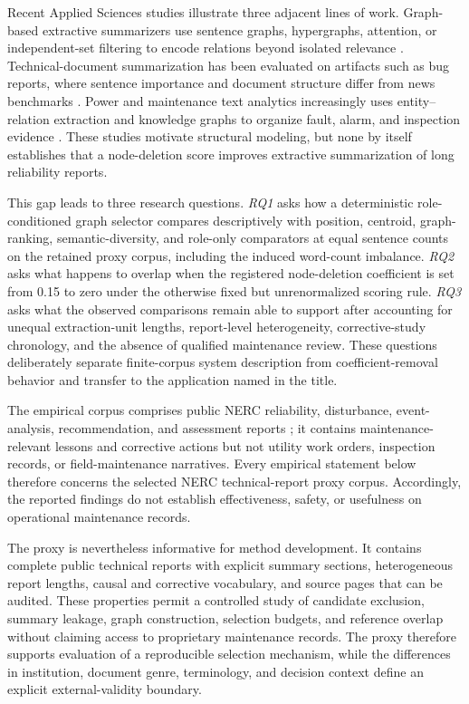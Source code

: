 \documentclass[applsci,article,submit,moreauthors]{Definitions/mdpi}
\begin{document}
Recent Applied Sciences studies illustrate three adjacent lines of work. Graph-based extractive summarizers use sentence graphs, hypergraphs, attention, or independent-set filtering to encode relations beyond isolated relevance \cite{siragusa2022sentencegraph,onan2024mches,hark2025mis}. Technical-document summarization has been evaluated on artifacts such as bug reports, where sentence importance and document structure differ from news benchmarks \cite{koh2022bugreport}. Power and maintenance text analytics increasingly uses entity--relation extraction and knowledge graphs to organize fault, alarm, and inspection evidence \cite{liu2022powerfault,ma2025alarm,zgg2026bridge}. These studies motivate structural modeling, but none by itself establishes that a node-deletion score improves extractive summarization of long reliability reports.

This gap leads to three research questions. \textit{RQ1} asks how a deterministic role-conditioned graph selector compares descriptively with position, centroid, graph-ranking, semantic-diversity, and role-only comparators at equal sentence counts on the retained proxy corpus, including the induced word-count imbalance. \textit{RQ2} asks what happens to overlap when the registered node-deletion coefficient is set from 0.15 to zero under the otherwise fixed but unrenormalized scoring rule. \textit{RQ3} asks what the observed comparisons remain able to support after accounting for unequal extraction-unit lengths, report-level heterogeneity, corrective-study chronology, and the absence of qualified maintenance review. These questions deliberately separate finite-corpus system description from coefficient-removal behavior and transfer to the application named in the title.

The empirical corpus comprises public NERC reliability, disturbance, event-analysis, recommendation, and assessment reports \cite{nercEventAnalysis,nerc2015qualityreport}; it contains maintenance-relevant lessons and corrective actions but not utility work orders, inspection records, or field-maintenance narratives. Every empirical statement below therefore concerns the selected NERC technical-report proxy corpus. Accordingly, the reported findings do not establish effectiveness, safety, or usefulness on operational maintenance records.

The proxy is nevertheless informative for method development. It contains complete public technical reports with explicit summary sections, heterogeneous report lengths, causal and corrective vocabulary, and source pages that can be audited. These properties permit a controlled study of candidate exclusion, summary leakage, graph construction, selection budgets, and reference overlap without claiming access to proprietary maintenance records. The proxy therefore supports evaluation of a reproducible selection mechanism, while the differences in institution, document genre, terminology, and decision context define an explicit external-validity boundary.
\end{document}

